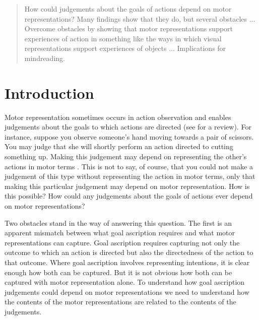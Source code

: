 \documentclass[12pt,\papersize]{extarticle}
\date{}
\begin{document}
\setlength\footnotesep{1em}


\maketitle
\title{}





\begin{abstract}
\noindent
%
How could judgements about the goals of actions depend on motor representations? Many findings show that they do, but several obstacles ... Overcome obstacles by showing that motor representations support experiences of action in something like the ways in which visual representations support experiences of objects ... Implications for mindreading.
%
\end{abstract}










\section{Introduction}

Motor representation sometimes occurs in action observation and enables judgements about the goals to which actions are directed (see \citealp{rizzolatti_functional_2010} for a review). For instance, suppose you observe someone's hand moving towards a pair of scissors. You may judge that she will shortly perform an action directed to cutting something up. Making this judgement may depend on representing the other's actions in motor terms \citep{boria:2009_intention, ortigue:2010_understanding}.  This is not to say, of course, that you could not make a judgement of this type without representing the action in motor terms, only that making this particular judgement may depend on motor representation. How is this possible? How could any judgements about the goals of actions ever depend on motor representations?

Two obstacles stand in the way of answering this question. The first is an apparent mismatch between what goal ascription requires and what motor representations can capture. Goal ascription requires capturing not only the outcome to which an action is directed but also the directedness of the action to that outcome. Where goal ascription involves representing intentions, it is clear enough how both can be captured. But it is not obvious how both can be captured with motor representation alone. To understand how goal ascription judgements could depend on motor representations we need to understand how the contents of the motor representations are related to the contents of the judgements.
\end{document}
